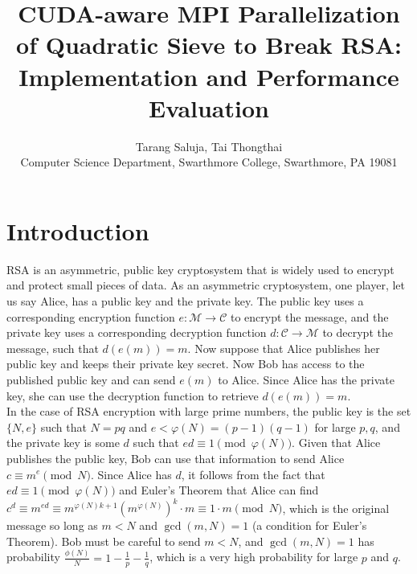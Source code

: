 \documentclass[11pt,twocolumn]{article}
\begin{document}

\title{CUDA-aware MPI Parallelization of Quadratic Sieve to Break RSA: Implementation and Performance Evaluation}

\author{Tarang Saluja, Tai Thongthai \\
Computer Science Department, Swarthmore College, Swarthmore, PA  19081}

\maketitle

\section {Introduction}\label{intro}
RSA is an asymmetric, public key cryptosystem that is widely used to encrypt and protect small pieces of data. As an asymmetric cryptosystem, one player, let us say Alice, has a public key and the private key. The public key uses a corresponding encryption function $e : \mathcal{M} \to \mathcal{C}$ to encrypt the message, and the private key uses a corresponding decryption function $d: \mathcal{C} \to \mathcal{M}$ to decrypt the message, such that $d(e(m)) = m$. Now suppose that Alice publishes her public key and keeps their private key secret. Now Bob has access to the published public key and can send $e(m)$ to Alice. Since Alice has the private key, she can use the decryption function to retrieve $d(e(m)) = m$. \\
\indent In the case of RSA encryption with large prime numbers, the public key is the set $\{N, e \}$ such that $N = pq$ and $e < \varphi(N) = (p-1)(q-1)$ for large $p, q$, and the private key is some $d$ such that $ed \equiv 1 \pmod{\varphi(N)}$. Given that Alice publishes the public key, Bob can use that information to send Alice $c \equiv m^e \pmod{N}$. Since Alice has $d$, it follows from the fact that $ed \equiv 1 \pmod{\varphi(N)}$ and Euler's Theorem that Alice can find $c^d \equiv m^{ed} \equiv m^{\varphi(N)k  + 1} (m^{\varphi(N)})^k \cdot m \equiv 1 \cdot m \pmod{N}$, which is the original message so long as $m < N$ and $\gcd(m, N) = 1$ (a condition for Euler's Theorem). Bob must be careful to send $m < N$, and $\gcd(m, N) = 1$ has probability $\frac{\phi(N)}{N} = 1 - \frac{1}{p} - \frac{1}{q}$, which is a very high probability for large $p$ and $q$.\\
\end{document}
